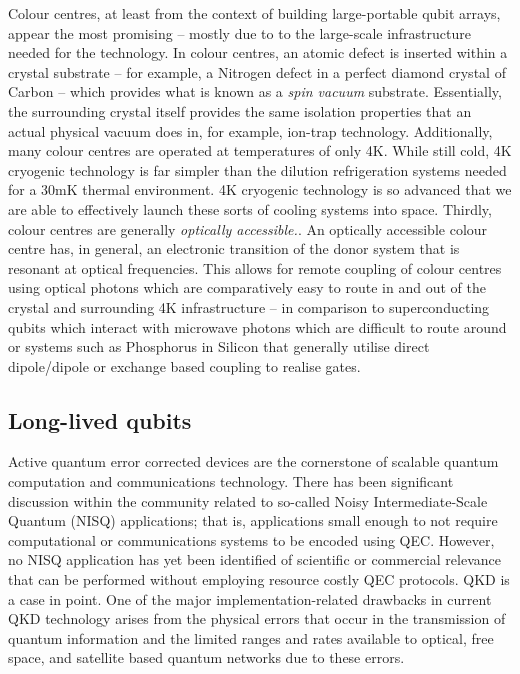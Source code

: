 \documentclass[twocolumn, aps, rmp, amsmath, amssymb, nofootinbib, superscriptaddress, longbibliography, floatfix, table-of-contents, eqsecnum]{revtex4-2}
\begin{document}
Colour centres, at least from the context of building large-portable qubit arrays, appear the most promising -- mostly due to to the large-scale infrastructure needed for the technology. In colour centres, an atomic defect is inserted within a crystal substrate -- for example, a Nitrogen defect in a perfect diamond crystal of Carbon -- which provides what is known as a \textit{spin vacuum} substrate. Essentially, the surrounding crystal itself provides the same isolation properties that an actual physical vacuum does in, for example, ion-trap technology. Additionally, many colour centres are operated at temperatures of only 4K. While still cold, 4K cryogenic technology is far simpler than the dilution refrigeration systems needed for a 30mK thermal environment. 4K cryogenic technology is so advanced that we are able to effectively launch these sorts of cooling systems into space. Thirdly, colour centres are generally \textit{optically accessible.}. An optically accessible colour centre has, in general, an electronic transition of the donor system that is resonant at optical frequencies. This allows for remote coupling of colour centres using optical photons which are comparatively easy to route in and out of the crystal and surrounding 4K infrastructure -- in comparison to superconducting qubits which interact with microwave photons which are difficult to route around or systems such as Phosphorus in Silicon that generally utilise direct dipole/dipole or exchange based coupling to realise gates. 

\subsection{Long-lived qubits}

Active quantum error corrected devices are the cornerstone of scalable quantum computation and communications technology. There has been significant discussion within the community related to so-called Noisy Intermediate-Scale Quantum (NISQ) applications; that is, applications small enough to not require computational or communications systems to be encoded using QEC. However, no NISQ application has yet been identified of scientific or commercial relevance that can be performed without employing resource costly QEC protocols. QKD is a case in point. One of the major implementation-related drawbacks in current QKD technology arises from the physical errors that occur in the transmission of quantum information and the limited ranges and rates available to optical, free space, and satellite based quantum networks due to these errors. 
\end{document}
